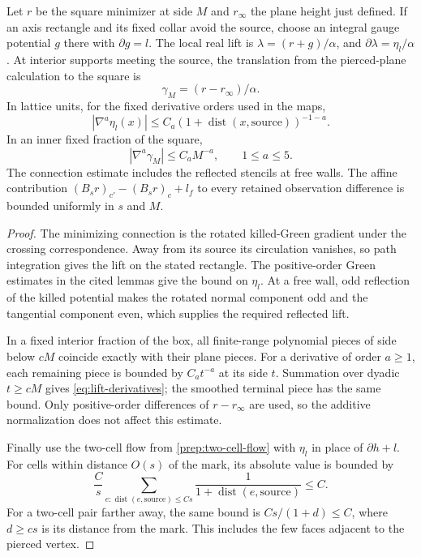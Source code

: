 \begin{lemma}\label{prep:lifts}
Let $r$ be the square minimizer at side $M$ and $r_\infty$ the plane
height just defined.
If an axis rectangle and its fixed collar avoid the source, choose an
integral gauge potential $g$ there with $\partial g=l$.  The local real
lift is $\lambda=(r+g)/\alpha$, and
$\partial\lambda=\eta_l/\alpha$.  At interior supports meeting the source,
the translation from the pierced-plane calculation to the square is
\begin{equation}\label{eq:lift-difference}
                         \gamma_M=(r-r_\infty)/\alpha.
\end{equation}
In lattice units, for the fixed derivative orders used in the maps,
\[
 |\nabla^a\eta_l(x)|\le C_a(1+\operatorname{dist}(x,\text{source}))^{-1-a}.
\]
In an inner fixed fraction of the square,
\begin{equation}\label{eq:lift-derivatives}
                 |\nabla^a\gamma_M|\le C_aM^{-a},
                 \qquad 1\le a\le5.
\end{equation}
The connection estimate includes the reflected stencils at free walls.
The affine contribution $(B_sr)_{c'}-(B_sr)_c+l_f$ to every retained
observation difference is bounded uniformly in $s$ and $M$.
\end{lemma}

\begin{proof}
The minimizing connection is the rotated killed-Green gradient under the
crossing correspondence.  Away from its source its circulation vanishes,
so path integration gives the lift on the stated rectangle.  The
positive-order Green estimates in the cited lemmas give the bound on
$\eta_l$.  At a free wall, odd reflection of the killed potential makes
the rotated normal component odd and the tangential component even,
which supplies the required reflected lift.

In a fixed interior fraction of the box, all finite-range polynomial
pieces of side below $cM$ coincide exactly with their plane pieces.
For a derivative of order $a\ge1$, each remaining piece is bounded by
$C_at^{-a}$ at its side $t$.  Summation over dyadic $t\ge cM$ gives
\eqref{eq:lift-derivatives}; the smoothed terminal piece has the same
bound.  Only positive-order differences of $r-r_\infty$ are used, so
the additive normalization does not affect this estimate.

Finally use the two-cell flow from \eqref{prep:two-cell-flow} with
$\eta_l$ in place of $\partial h+l$.  For cells within distance $O(s)$ of
the mark, its absolute value is bounded by
\[
 \frac Cs\sum_{e:\operatorname{dist}(e,\text{source})\le Cs}
              \frac{1}{1+\operatorname{dist}(e,\text{source})}\le C.
\]
For a two-cell pair farther away, the same bound is
$Cs/(1+d)\le C$, where $d\ge cs$ is its distance from the mark.
This includes the few faces adjacent to the pierced vertex.
\end{proof}

